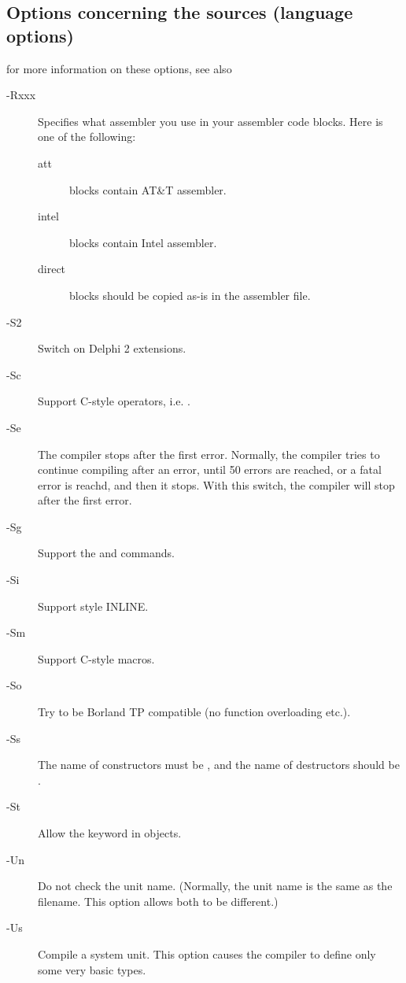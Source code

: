 \documentclass{report}
\newcommand{\olabel}[1]{\label{option:#1}}
\begin{document}
\subsection{Options concerning the sources (language options)}
for more information on these options, see also \progref
\begin{description}
\item [-Rxxx] \olabel{R} Specifies what assembler you use in your  assembler code
blocks. Here  is one of the following:
\begin{description}
\item [att\ ]  blocks contain AT\&T assembler.
\item [intel]  blocks contain Intel assembler.
\item [direct]  blocks should be copied as-is in the assembler
file.   
\end{description}
\item [-S2] \olabel{Stwo} Switch on Delphi 2 extensions.
\item [-Sc] \olabel{Sc} Support C-style operators, i.e. .
\item [-Se] \olabel{Se} The compiler stops after the first error. Normally,
the compiler tries to continue compiling after an error, until 50 errors are
reached, or a fatal error is reachd, and then it stops. With this switch,
the compiler will stop after the first error.
\item [-Sg] \olabel{Sg} Support the  and  commands.
\item [-Si] \olabel{Si} Support  style INLINE.
\item [-Sm] \olabel{Sm} Support C-style macros.
\item [-So] \olabel{So} Try to be Borland TP compatible (no function
overloading etc.).
\item [-Ss] \olabel{Ss} The name of constructors must be , and the
name of destructors should be .
\item [-St] \olabel{St} Allow the  keyword in objects.
\item [-Un] \olabel{Un} Do not check the unit name. (Normally, the unit name
is the same as the filename. This option allows both to be different.)
\item [-Us] \olabel{Us} Compile a system unit. This option causes the
compiler to define only some very basic types.
\end{description}
\end{document}
